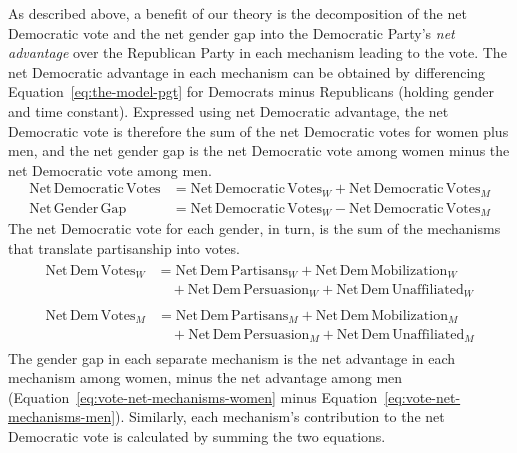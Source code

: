 \documentclass[12pt
               ,final
               ]{article}
\begin{document}
As described above, a benefit of our theory is the decomposition of the net Democratic vote and the net gender gap into the Democratic Party's \emph{net advantage} over the Republican Party in each mechanism leading to the vote. The net Democratic advantage in each mechanism can be obtained by differencing Equation~\ref{eq:the-model-pgt} for Democrats minus Republicans (holding gender and time constant). Expressed using net Democratic advantage, the net Democratic vote is therefore the sum of the net Democratic votes for women plus men, and the net gender gap is the net Democratic vote among women minus the net Democratic vote among men.
%
\begin{align}
  \mathrm{Net \, Democratic \, Votes} 
    &= \mathrm{Net \, Democratic \, Votes}_{W} + 
       \mathrm{Net \, Democratic \, Votes}_{M} \\
  \mathrm{Net \, Gender \, Gap} 
    &= \mathrm{Net \, Democratic \, Votes}_{W} - 
       \mathrm{Net \, Democratic \, Votes}_{M}
\end{align}
%
The net Democratic vote for each gender, in turn, is the sum of the mechanisms that translate partisanship into votes.
\begin{align}
  \label{eq:vote-net-mechanisms-women} 
  \begin{split}
    \mathrm{Net \, Dem \, Votes}_{W} 
    &= \mathrm{Net \, Dem \, Partisans}_{W} + 
       \mathrm{Net \, Dem \, Mobilization}_{W} \\
       &\quad + \mathrm{Net \, Dem \, Persuasion}_{W} 
              + \mathrm{Net \, Dem \, Unaffiliated}_{W}
  \end{split} \\
  \label{eq:vote-net-mechanisms-men} 
  \begin{split}
    \mathrm{Net \, Dem \, Votes}_{M} 
    &= \mathrm{Net \, Dem \, Partisans}_{M} + 
       \mathrm{Net \, Dem \, Mobilization}_{M} \\
       &\quad + \mathrm{Net \, Dem \, Persuasion}_{M} 
              + \mathrm{Net \, Dem \, Unaffiliated}_{M}
  \end{split}
\end{align}
The gender gap in each separate mechanism is the net advantage in each mechanism among women, minus the net advantage among men (Equation~\ref{eq:vote-net-mechanisms-women} minus Equation~\ref{eq:vote-net-mechanisms-men}). Similarly, each mechanism's contribution to the net Democratic vote is calculated by summing the two equations. 
\end{document}
